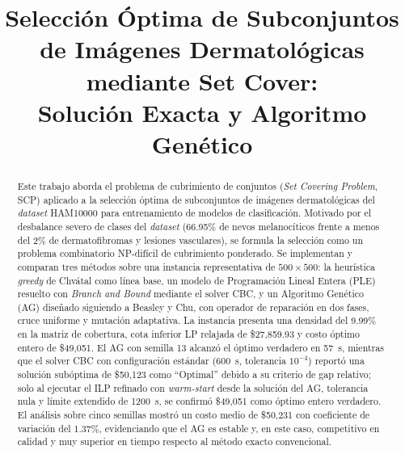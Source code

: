 \documentclass[conference]{IEEEtran}
\begin{document}
\title{Selección Óptima de Subconjuntos de Imágenes Dermatológicas mediante Set Cover:\\ Solución Exacta y Algoritmo Genético}

\author{
\and
{}
}

\maketitle

\begin{abstract}
Este trabajo aborda el problema de cubrimiento de conjuntos (\textit{Set Covering Problem}, SCP) aplicado a la selección óptima de subconjuntos de imágenes dermatológicas del \textit{dataset} HAM10000 para entrenamiento de modelos de clasificación. Motivado por el desbalance severo de clases del \textit{dataset} (66.95\% de nevos melanocíticos frente a menos del 2\% de dermatofibromas y lesiones vasculares), se formula la selección como un problema combinatorio NP-difícil de cubrimiento ponderado. Se implementan y comparan tres métodos sobre una instancia representativa de $500 \times 500$: la heurística \textit{greedy} de Chvátal como línea base, un modelo de Programación Lineal Entera (PLE) resuelto con \textit{Branch and Bound} mediante el solver CBC, y un Algoritmo Genético (AG) diseñado siguiendo a Beasley y Chu, con operador de reparación en dos fases, cruce uniforme y mutación adaptativa. La instancia presenta una densidad del 9.99\% en la matriz de cobertura, cota inferior LP relajada de \$27,859.93 y costo óptimo entero de \$49,051. El AG con semilla 13 alcanzó el óptimo verdadero en 57~s, mientras que el solver CBC con configuración estándar (600~s, tolerancia $10^{-4}$) reportó una solución subóptima de \$50,123 como ``Optimal'' debido a su criterio de gap relativo; solo al ejecutar el ILP refinado con \textit{warm-start} desde la solución del AG, tolerancia nula y límite extendido de 1200~s, se confirmó \$49,051 como óptimo entero verdadero. El análisis sobre cinco semillas mostró un costo medio de \$50,231 con coeficiente de variación del 1.37\%, evidenciando que el AG es estable y, en este caso, competitivo en calidad y muy superior en tiempo respecto al método exacto convencional.
\end{abstract}
\end{document}
